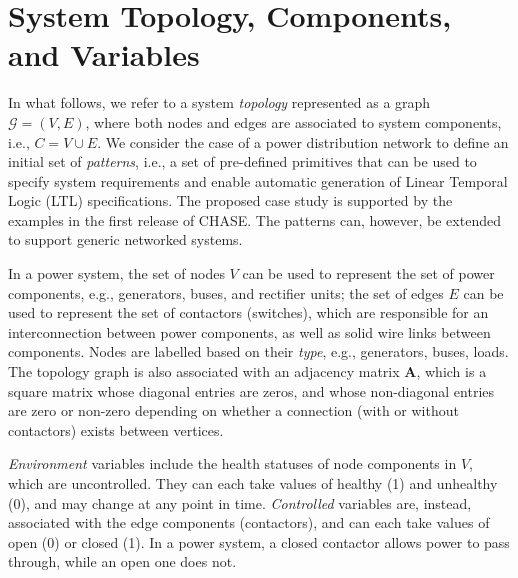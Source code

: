 \documentclass[journal]{IEEEtran}
\newcommand{\pfr}[1]{\mathcal{#1}}
\begin{document}

\section{System Topology, Components, and Variables}\label{sec:variables}

In what follows, we refer to a system \emph{topology} represented as a graph $\pfr{G}=(V,E)$, 
where both nodes and edges are associated to system components, i.e., $C = V \cup E$. 
We consider the case of a power distribution network to define an initial set of 
\emph{patterns}, i.e.,  a set of pre-defined
primitives that can be 
used to specify system requirements and enable automatic generation of Linear Temporal Logic (LTL) specifications. The proposed case study is supported by the examples in the first release of CHASE. The patterns can, however, be extended to support generic networked systems. 

In a power system, the set of nodes $V$ 
can be used to represent the set of power components, e.g., generators, buses, and rectifier
units; the set of edges $E$
can be used to represent the set of contactors (switches), which are responsible for an interconnection between power components, as well as solid wire links between components. Nodes are labelled based on their \emph{type}, e.g., generators, buses, loads. 
The topology graph is also associated with an adjacency matrix $\textbf{A}$, which is a square matrix whose diagonal entries are
zeros, and whose non-diagonal entries are zero or non-zero depending on whether a
connection (with or without contactors) exists between vertices. 

\textit{Environment} variables include the health statuses of node components in $V$, which 
are uncontrolled. They can each take values of healthy
(1) and unhealthy (0), and may change at any point in time.
\textit{Controlled} variables are, instead, associated with the edge components (contactors), and can each take values of open
(0) or closed (1). In a power system, a closed contactor allows power to pass through, while an
open one does not.
\end{document}
